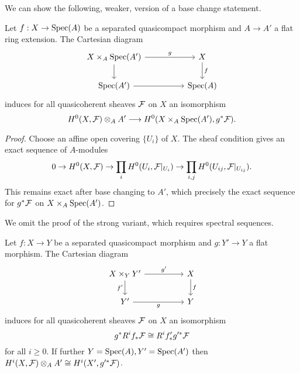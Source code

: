 We can show the following, weaker, version of a base change statement. 
\begin{proposition}\label{prop: weak flat base change}
    Let $f:X\to \operatorname{Spec}(A)$ be a separated quasicompact morphism and $A\to A'$ a flat ring extension. The Cartesian diagram 
    $$%
    \begin{tikzcd}
        {X\times_{A}\spec(A')} && X \\
        {\spec(A')} && {\spec(A)}
        \arrow["g", from=1-1, to=1-3]
        \arrow[from=1-1, to=2-1]
        \arrow["f", from=1-3, to=2-3]
        \arrow[from=2-1, to=2-3]
    \end{tikzcd}$$
    induces for all quasicoherent sheaves $\mathcal{F}$ on $X$ an isomorphism 
    $$H^{0}(X,\mathcal{F})\otimes_{A}A'\longrightarrow H^{0}(X\times_{A}\operatorname{Spec}(A'),g^{*}\mathcal{F}).$$
\end{proposition}
\begin{proof}
    Choose an affine open covering $\{U_{i}\}$ of $X$. The sheaf condition gives an exact sequence of $A$-modules
    $$0\to H^{0}(X,\mathcal{F})\to\prod_{i}H^{0}(U_{i},\mathcal{F}|_{U_{i}})\to\prod_{i,j}H^{0}(U_{ij},\mathcal{F}|_{U_{ij}}).$$
    This remains exact after base changing to $A'$, which precisely the exact sequence for $g^{*}\mathcal{F}$ on $X\times_{A}\operatorname{Spec}(A')$. 
\end{proof} 
We omit the proof of the strong variant, which requires spectral sequences. 
\begin{proposition}\label{prop: flat base change}
    Let $f:X\to Y$ be a separated quasicompact morphism and $g:Y'\to Y$ a flat morphism. The Cartesian diagram 
    $$%
    \begin{tikzcd}
        {X\times_{Y}Y'} && X \\
        {Y'} && Y
        \arrow["{g'}", from=1-1, to=1-3]
        \arrow["{f'}"', from=1-1, to=2-1]
        \arrow["f", from=1-3, to=2-3]
        \arrow["g"', from=2-1, to=2-3]
    \end{tikzcd}$$
    induces for all quasicoherent sheaves $\mathcal{F}$ on $X$ an isomorphism 
    $$g^{*}R^{i}f_{*}\mathcal{F}\cong R^{i}f'_{*}g'^{*}\mathcal{F}$$
    for all $i\geq 0$. If further $Y=\operatorname{Spec}(A),Y'=\operatorname{Spec}(A')$ then $H^{i}(X,\mathcal{F})\otimes_{A}A'\cong H^{i}(X',g'^{*}\mathcal{F})$. 
\end{proposition}
